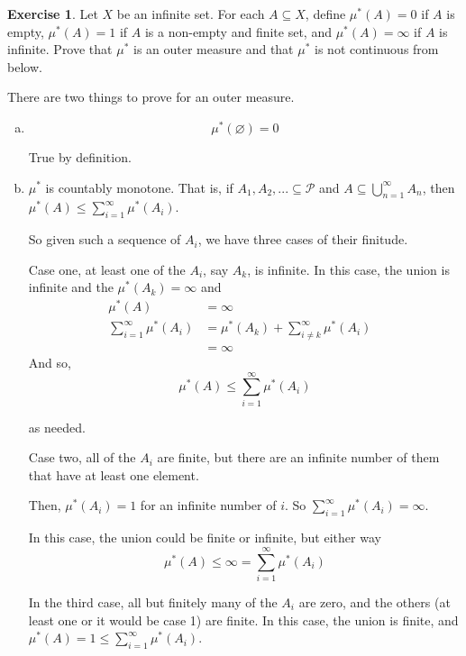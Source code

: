 \documentclass[11pt,oneside]{article}
\numberwithin{equation}{section}
\theoremstyle{definition}
\newtheorem{exercise}{Exercise}
\begin{document}
\begin{exercise}
  Let $X$ be an infinite set.  For each $A \subseteq X$,
  define $\mu^* (A) = 0$ if $A$ is empty, $\mu^*(A) = 1$ if
  $A$ is a non-empty and finite set, and $\mu^*(A) = \infty$
  if $A$ is infinite.  Prove that $\mu^*$ is an
  outer measure and that $\mu^*$ is not continuous from below.
\end{exercise}
\begin{solution}
  There are two things to prove for an outer measure.
  \begin{enumerate}[(a)]
    \item
      $$
      \mu ^ *(\varnothing) = 0
      $$

    True by definition.
    \item
      $      \mu ^ * $ is countably monotone.  That is, if $A_1, A_2, ... \subseteq \mathcal{P}$ and
      $A \subseteq \bigcup \limits _ {n=1} ^ {\infty} A_n$, then
      $\mu ^ * (A) \leq \sum \limits _ {i=1} ^ {\infty} \mu ^* ( A_i)$.

      So given such a sequence of $A_i$, we have three cases of their finitude.

      Case one, at least one of the $A_i$, say $A_k$, is infinite.  In this case,
      the union is infinite and the $\mu ^ * (A_k) = \infty$ and
      \begin{align*}
        \mu ^ * (A) &= \infty  & \\
        \sum \limits _ {i=1} ^ {\infty} \mu ^* ( A_i) &= \mu ^* (A_k) + \sum _{i\neq k} ^ \infty \mu ^*  (A_i) & \\ 
        & = \infty  & 
      \end{align*}
      And so,
      $$
      \mu ^ * (A) \leq   \sum \limits _ {i=1} ^ {\infty} \mu ^* ( A_i)  
      $$

      as needed.

      Case two, all of the $A_i$ are finite, but there are an infinite
      number of them that have at least one element.

      Then, $\mu ^*(A_i) = 1$ for an infinite number of $i$.  So
      $   \sum \limits _ {i=1} ^ {\infty} \mu ^* ( A_i) = \infty $. 

      In this case, the union could be finite or infinite, but either way 
      $$
      \mu^* (A) \leq \infty =  \sum \limits _ {i=1} ^ {\infty} \mu ^* ( A_i) 
      $$

      In the third case, all but finitely many of the $A_i$ are zero,
      and the others (at least one or it would be case 1) are finite.
      In this case, the union is finite, and $\mu^* (A) = 1 \leq \sum \limits _ {i=1} ^ {\infty} \mu ^* ( A_i)$.


\end{enumerate}
\end{solution}
\end{document}
